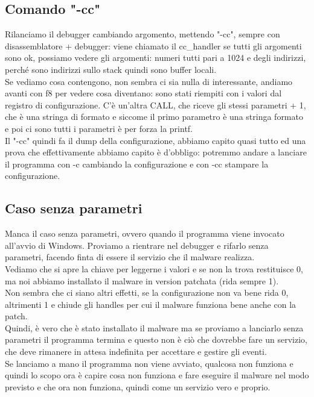 \documentclass[12pt, oneside]{extbook}
\begin{document}
\subsection{Comando "-cc"}
Rilanciamo il debugger cambiando argomento, mettendo "-cc", sempre con disassemblatore +  debugger: viene chiamato il cc\_handler se tutti gli argomenti sono ok, possiamo vedere gli argomenti: numeri tutti pari a 1024 e degli indirizzi, perché sono indirizzi sullo stack quindi sono buffer locali.\\Se vediamo cosa contengono, non sembra ci sia nulla di interessante, andiamo avanti con f8 per vedere cosa diventano: sono stati riempiti con i valori dal registro di configurazione. C'è un'altra CALL, che riceve gli stessi parametri + 1, che è una stringa di formato e siccome il primo parametro è una stringa formato e poi ci sono tutti i parametri è per forza la printf.\\Il "-cc" quindi fa il dump della configurazione, abbiamo capito quasi tutto ed una prova che effettivamente abbiamo capito è d'obbligo: potremmo andare a lanciare il programma con -c cambiando la configurazione e con -cc stampare la configurazione.
\subsection{Caso senza parametri}
Manca il caso senza parametri, ovvero quando il programma viene invocato all'avvio di Windows. Proviamo a rientrare nel debugger e rifarlo senza parametri, facendo finta di essere il servizio che il malware realizza.\\Vediamo che si apre la chiave per leggerne i valori e se non la trova restituisce 0, ma noi abbiamo installato il malware in version patchata (rida sempre 1).\\Non sembra che ci siano altri effetti, se la configurazione non va bene rida 0, altrimenti 1 e chiude gli handles per cui il malware funziona bene anche con la patch.\\Quindi, è vero che è stato installato il malware ma se proviamo a lanciarlo senza parametri il programma termina e questo non è ciò che dovrebbe fare un servizio, che deve rimanere in attesa indefinita per accettare e gestire gli eventi.\\Se lanciamo a mano il programma non viene avviato, qualcosa non funziona e quindi lo scopo ora è capire cosa non funziona e fare eseguire il malware nel modo previsto e che ora non funziona, quindi come un servizio vero e proprio.
\end{document}
